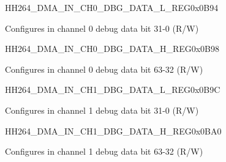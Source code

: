     
    \begin{register}{H}{H264\_DMA\_IN\_CH0\_DBG\_DATA\_L\_REG}{0x0B94}\label{regdesc:H264DMAINCH0DBGDATALREG}
    \regnewline%
    \begin{regdesc}\begin{reglist}
    \label{fielddesc:H264INCH0DBGDATAL}\item [H264\_IN\_CH0\_DBG\_DATA\_L] Configures in channel 0 debug data bit 31-0 (R/W)
    \end{reglist}\end{regdesc}
    \end{register}
    
    
    \begin{register}{H}{H264\_DMA\_IN\_CH0\_DBG\_DATA\_H\_REG}{0x0B98}\label{regdesc:H264DMAINCH0DBGDATAHREG}
    \regnewline%
    \begin{regdesc}\begin{reglist}
    \label{fielddesc:H264INCH0DBGDATAH}\item [H264\_IN\_CH0\_DBG\_DATA\_H] Configures in channel 0 debug data bit 63-32 (R/W)
    \end{reglist}\end{regdesc}
    \end{register}
    
    
    \begin{register}{H}{H264\_DMA\_IN\_CH1\_DBG\_DATA\_L\_REG}{0x0B9C}\label{regdesc:H264DMAINCH1DBGDATALREG}
    \regnewline%
    \begin{regdesc}\begin{reglist}
    \label{fielddesc:H264INCH1DBGDATAL}\item [H264\_IN\_CH1\_DBG\_DATA\_L] Configures in channel 1 debug data bit 31-0 (R/W)
    \end{reglist}\end{regdesc}
    \end{register}
    
    
    \begin{register}{H}{H264\_DMA\_IN\_CH1\_DBG\_DATA\_H\_REG}{0x0BA0}\label{regdesc:H264DMAINCH1DBGDATAHREG}
    \regnewline%
    \begin{regdesc}\begin{reglist}
    \label{fielddesc:H264INCH1DBGDATAH}\item [H264\_IN\_CH1\_DBG\_DATA\_H] Configures in channel 1 debug data bit 63-32 (R/W)
    \end{reglist}\end{regdesc}
    \end{register}
    
